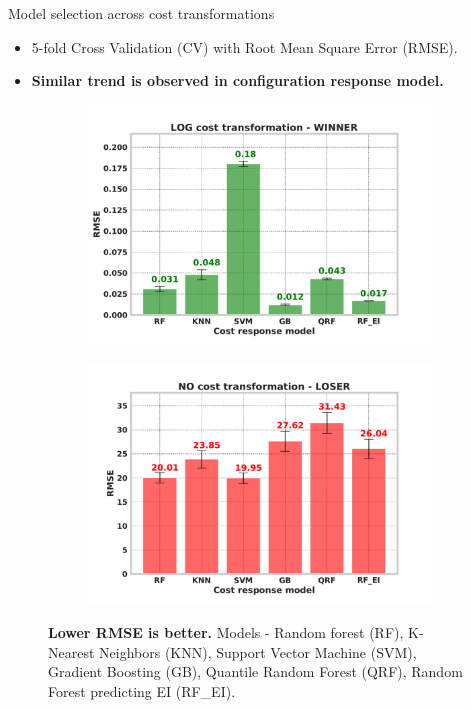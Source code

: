 \documentclass[10pt]{beamer}
\begin{document}
\begin{frame}[t]{Model selection across cost transformations}

\begin{itemize}
    \item 5-fold Cross Validation (CV) with Root Mean Square Error (RMSE). 
    \newline
    \item \textbf{Similar trend is observed in configuration response model.}
    \newline
\end{itemize}
\begin{figure}[!ht]
\centering
\begin{subfigure}{.45\textwidth}
\centering
\includegraphics[width=\linewidth]{images/rmse-cost_1.pdf}
\end{subfigure}
\begin{subfigure}{.45\textwidth}
\centering
\includegraphics[width=\linewidth]{images/rmse-cost_0.pdf}
\end{subfigure}
\caption{\textbf{Lower RMSE is better.} Models - Random forest (RF), K- Nearest Neighbors (KNN), Support Vector Machine (SVM), Gradient Boosting (GB), Quantile Random Forest (QRF), Random Forest predicting EI (RF\_EI).}
\label{Fig:modelselection_compare}
\end{figure}
\end{frame}{}
\end{document}

